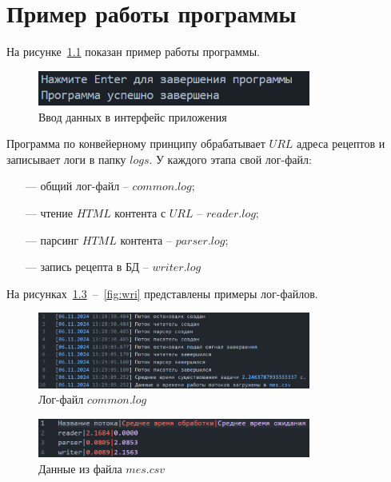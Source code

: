\chapter{Пример работы программы}

На рисунке~\ref{fig:int} показан пример работы программы. 
\begin{figure}[h]
	\centering
	\includegraphics[width=0.8\textwidth]{images/examples/interface.png}
	\caption{Ввод данных в интерфейс приложения}
	\label{fig:int}
\end{figure}

Программа по конвейерному принципу обрабатывает $URL$ адреса рецептов и записывает логи в папку $logs$. У каждого этапа свой лог-файл:
\begin{itemize}
    \item[---] общий лог-файл -- $common.log$;
    \item[---] чтение $HTML$ контента с $URL$ -- $reader.log$;
    \item[---] парсинг $HTML$ контента -- $parser.log$;
    \item[---] запись рецепта в БД -- $writer.log$ 
\end{itemize}

На рисунках~\ref{fig:com}~--~\ref{fig:wri} представлены примеры лог-файлов.

\begin{figure}[h]
	\centering
	\includegraphics[width=0.8\textwidth]{images/examples/common_log.png}
	\caption{Лог-файл $common.log$}
	\label{fig:com}
\end{figure}

\begin{figure}[h]
	\centering
	\includegraphics[width=0.8\textwidth]{images/examples/mes_table.png}
	\caption{Данные из файла $mes.csv$}
	\label{fig:com}
\end{figure}

